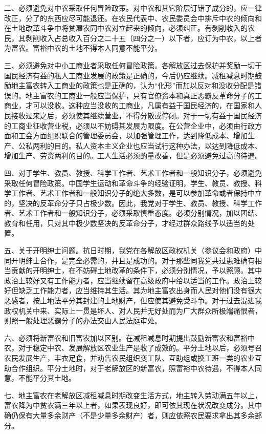 二、必须避免对中农采取任何冒险政策。对中农和其它阶层订错了成分的，应一律改正，分了的东西应尽可能退还。在农民代表中、农民委员会中排斥中农的倾向和在土地改革斗争中将贫雇农同中农对立起来的倾向，必须纠正。有剥削收入的农民，其剥削收入占总收入百分之二十五（四分之一）以下者，应订为中农，以上者为富农。富裕中农的土地不得本人同意不能平分。

三、必须避免对中小工商业者采取任何冒险政策。各解放区过去保护并奖励一切于国民经济有益的私人工商业发展的政策是正确的，今后仍应继续。减租减息时期鼓励地主富农转入工商业的政策也是正确的，认为“化形”而加以反对和没收分配是错误的。地主富农的工商业一般应当保护，只有官僚资本和真正恶霸反革命分子的工商业，才可以没收。这种应当没收的工商业，凡属有益于国民经济的，在国家和人民接收过来之后，必须使其继续营业，不得分散或停闭。对于一切有益于国民经济的工商业征收营业税，必须以不妨碍其发展为限度。在公营企业中，必须由行政方面和工会方面组织联合的管理委员会，以加强管理工作，达到降低成本、增加生产、公私两利的目的。私人资本主义企业也应当试行这种办法，以达到降低成本、增加生产、劳资两利的目的。工人生活必须酌量改善，但是必须避免过高的待遇。

四、对于学生、教员、教授、科学工作者、艺术工作者和一般知识分子，必须避免采取任何冒险政策。中国学生运动和革命斗争的经验证明，学生、教员、教授、科学工作者、艺术工作者和一般知识分子的绝大多数，是可以参加革命或者保持中立的，坚决的反革命分子只占极少数。因此，我党对于学生、教员、教授、科学工作者、艺术工作者和一般知识分子，必须采取慎重态度。必须分别情况，加以团结、教育和任用，只对其中极少数坚决的反革命分子，才经过群众路线予以适当的处置。

五、关于开明绅士问题。抗日时期，我党在各解放区政权机关（参议会和政府）中同开明绅士合作，是完全必需的，并且是成功的。对于那些同我党共过患难确有相当贡献的开明绅士，在不妨碍土地改革的条件下，必须分别情况，予以照顾。其中政治上较好又有工作能力者，应当继续留在高级政府中给以适当的工作。政治上较好但缺乏工作能力者，应当维持其生活。其为地主富农出身而人民对他们没有很大恶感者，按土地法平分其封建的土地财产，但应使其避免受斗争。对于过去混进我政权机关中来、实际上一贯是坏人、对人民并无好处而为广大群众所极端痛恨者，则照一般处理恶霸分子的办法交由人民法庭审处。

六、必须将新富农和旧富农加以区别。在减租减息时期提出鼓励新富农和富裕中农，对于稳定中农、发展解放区农业生产是收了成效的。平分土地以后，必须号召农民发展生产，丰衣足食，并劝告农民组织变工队、互助组或换工班一类的农业互助合作组织。平分土地时，对于老解放区的新富农，照富裕中农待遇，不得本人同意，不能平分其土地。

七、地主富农在老解放区减租减息时期改变生活方式，地主转入劳动满五年以上，富农降为中贫农满三年以上者，如果表现良好，即可依其现在状况改变成分。其中确仍保有大量多余财产（不是少量多余财产）者，则应依照农民要求拿出其多余部分。

